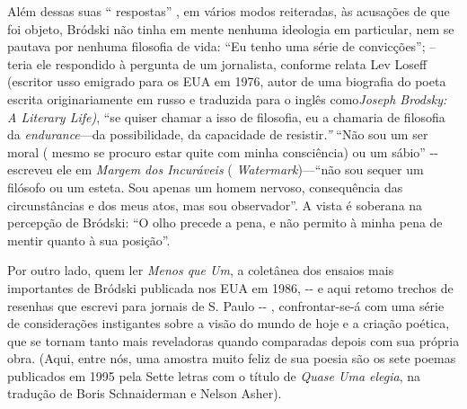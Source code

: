 Além dessas suas `` respostas'' , em vários modos reiteradas, às
acusações de que foi objeto, Bródski não tinha em mente nenhuma
ideologia em particular, nem se pautava por nenhuma filosofia de vida:
``Eu tenho uma série de convicções''; -- teria ele respondido à pergunta
de um jornalista, conforme relata Lev Loseff (escritor usso emigrado
para os EUA em 1976, autor de uma biografia do poeta escrita
originariamente em russo e traduzida para o inglês como\emph{Joseph
Brodsky: A Literary Life)}, ``se quiser chamar a isso de filosofia, eu a
chamaria de filosofia da \emph{endurance}---da possibilidade, da
capacidade de resistir\emph{.''} ``Não sou um ser moral ( mesmo se
procuro estar quite com minha consciência) ou um sábio'' -\/- escreveu
ele em \emph{Margem dos Incuráveis} ( \emph{Watermark})---``não sou
sequer um filósofo ou um esteta. Sou apenas um homem nervoso,
consequência das circunstâncias e dos meus atos, mas sou observador''. A
vista é soberana na percepção de Bródski: ``O olho precede a pena, e não
permito à minha pena de mentir quanto à sua posição''.

Por outro lado, quem ler \emph{Menos que Um}, a coletânea dos ensaios
mais importantes de Bródski publicada nos EUA em 1986, -\/- e aqui
retomo trechos de resenhas que escrevi para jornais de S. Paulo -\/- ,
confrontar-se-á com uma série de considerações instigantes sobre a visão
do mundo de hoje e a criação poética, que se tornam tanto mais
reveladoras quando comparadas depois com sua própria obra. (Aqui, entre
nós, uma amostra muito feliz de sua poesia são os sete poemas publicados
em 1995 pela Sette letras com o título de \emph{Quase Uma elegia}, na
tradução de Boris Schnaiderman e Nelson Asher).

